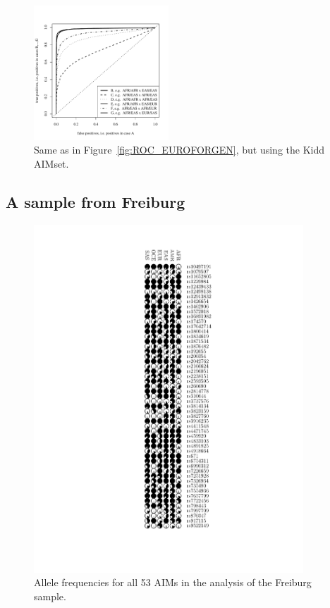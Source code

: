 \documentclass[12pt]{article}
\theoremstyle{definition}
\begin{document}
\begin{figure}[H]
  \begin{center}
    \includegraphics[width=0.45\textwidth]{roc-curve-Kidd.pdf}
  \end{center}
  \caption{Same as in Figure~\ref{fig:ROC_EUROFORGEN}, but using the
    Kidd AIMset.}
  \label{fig:ROC_Kidd} 
\end{figure}

\newpage
\subsection{A sample from Freiburg}

\begin{figure}[H]
  \parbox[b]{\textwidth}{\includegraphics[width=0.9\textwidth]{illumina_freqs.pdf}}
  \caption{\label{Sfig:allFreqs} Allele frequencies for all 53 AIMs in
    the analysis of the Freiburg sample.}
\end{figure}
\end{document}
